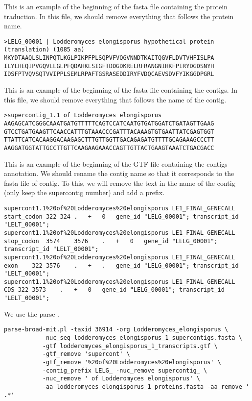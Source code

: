 This is an example of the beginning of the fasta file containing the protein traduction. In this file, we should remove 
everything that follows the protein name.
\begin{footnotesize}
\begin{verbatim}
>LELG_00001 | Lodderomyces elongisporus hypothetical protein (translation) (1085 aa)
MKYDTAAQLSLINPQTLKGLPIKPFPLSQPVFVQGVNNDTKAITQGVFLDVTVHFISLPA
ILYLHEQIPVGQVLLGLPFQDAHKLSIGFTDDGDKRELRFRANGNIHKFPIRYDGDSNYH
IDSFPTVQVSQTVVIPPLSEMLRPAFTGSRASEDDIRYFVDQCAEVSDVFYIKGGDPGRL
\end{verbatim}
\end{footnotesize}
This is an example of the beginning of the fasta file containing the contigs. In this file, we should remove 
everything that follows the name of the contig. 
\begin{footnotesize}
\begin{verbatim}
>supercontig_1.1 of Lodderomyces elongisporus
AAGAGCATCGGGCAAATGATGTTTTTCAGTCCATCAATGTGATGGATCTGATAGTTGAAG
GTCCTGATGAAGTTCAACCATTTGTAAACCCGATTTACAAAGTGTGAATTATCGAGTGGT
TTATTCATCACAAGGACAAGAGCTTTGTTGGTTGACAGAGATGTTTTGCAGAAAGCCCTT
AAGGATGGTATTGCCTTGTTCAAGAAGAAACCAGTTGTTACTGAAGTAAATCTGACGACC
\end{verbatim}
\end{footnotesize}


This is an example of the beginning of the GTF file containing the contigs annotation. We should rename the contig
name so that it corresponds to the fasta file of contig. To this, we will remove the text in the name of the contig (only keep the supercontig number)
and add a prefix.
\begin{footnotesize}
\begin{verbatim}
supercont1.1%20of%20Lodderomyces%20elongisporus	LE1_FINAL_GENECALL	start_codon	322	324	.	+	0	gene_id "LELG_00001"; transcript_id "LELT_00001";
supercont1.1%20of%20Lodderomyces%20elongisporus	LE1_FINAL_GENECALL	stop_codon	3574	3576	.	+	0	gene_id "LELG_00001"; transcript_id "LELT_00001";
supercont1.1%20of%20Lodderomyces%20elongisporus	LE1_FINAL_GENECALL	exon	322	3576	.	+	.	gene_id "LELG_00001"; transcript_id "LELT_00001";
supercont1.1%20of%20Lodderomyces%20elongisporus	LE1_FINAL_GENECALL	CDS	322	3573	.	+	0	gene_id "LELG_00001"; transcript_id "LELT_00001";
\end{verbatim}
\end{footnotesize}
We use the parse .
\begin{footnotesize}
\begin{verbatim}
parse-broad-mit.pl -taxid 36914 -org Lodderomyces_elongisporus \
		   -nuc_seq lodderomyces_elongisporus_1_supercontigs.fasta \
		   -gtf lodderomyces_elongisporus_1_transcripts.gtf \
		   -gtf_remove 'supercont' \
		   -gtf_remove '%20of%20Lodderomyces%20elongisporus' \
		   -contig_prefix LELG_ -nuc_remove supercontig_ \
		   -nuc_remove ' of Lodderomyces elongisporus' \
		   -aa lodderomyces_elongisporus_1_proteins.fasta -aa_remove ' .*'
\end{verbatim}
\end{footnotesize}

